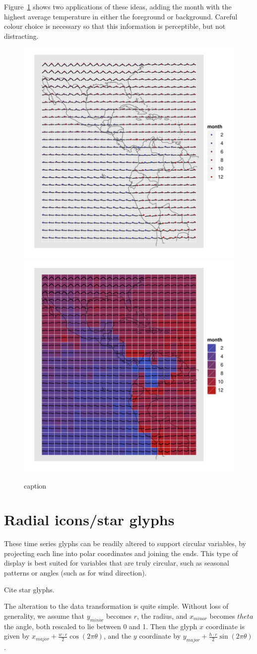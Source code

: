 \documentclass[oneside]{article}
\begin{document}
Figure~\ref{fig:ref-adv} shows two applications of these ideas, adding the month with the highest average temperature in either the foreground or background. Careful colour choice is necessary so that this information is perceptible, but not distracting.

\begin{figure}[htbp]
  \centering
    \includegraphics[width=0.5\linewidth]{ref-max-1}%
    \includegraphics[width=0.5\linewidth]{ref-max-2}
  \caption{caption}
  \label{fig:ref-adv}
\end{figure}


\section{Radial icons/star glyphs}

These time series glyphs can be readily altered to support circular variables, by projecting each line into polar coordinates and joining the ends. This type of display is best suited for variables that are truly circular, such as seasonal patterns or angles (such as for wind direction).

Cite star glyphs.

The alteration to the data transformation is quite simple. Without loss of generality, we assume that $y_{minor}$ becomes $r$, the radius, and $x_{minor}$ becomes $theta$ the angle, both rescaled to lie between 0 and 1. Then the glyph $x$ coordinate is given by $x_{major} + \frac{w \cdot r}{2} \cos(2 \pi \theta)$, and the $y$ coordinate by $y_{major} + \frac{h \cdot r}{2} \sin(2 \pi \theta)$.
\end{document}
